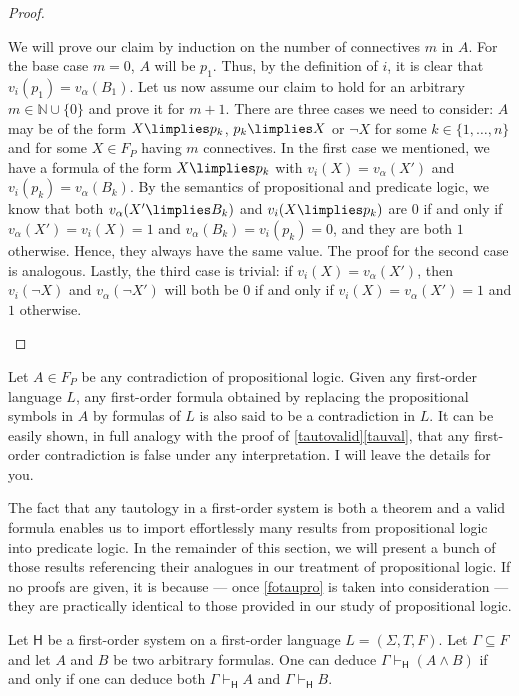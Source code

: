 \begin{proof}
\begin{parlist}
We will prove our claim by induction on the number of connectives $m$ in ${A}$. For the base case $m=0$, $A$ will be $p_1$. Thus, by the definition of $i$, it is clear that $v_i(p_1) = v_\alpha(B_1)$. 
Let us now assume our claim to hold for an arbitrary $m\in\mathbb{N} \cup \{0\}$ and prove it for $m+1$.
There are three cases we need to consider: $A$ may be of the form $X\limplies p_k$,  $p_k \limplies X$ or $\lnot X$ for some $k \in \{1,\ldots,n\}$ and for some $X\in F_P$ having $m$ connectives.
In the first case we mentioned, we have a formula of the form $X\limplies p_k$ with $v_i(X) = v_\alpha(X')$ and $v_i(p_k) = v_\alpha(B_k)$.
By the semantics of propositional and predicate logic, we know that both $v_\alpha(X' \limplies B_k)$ and $v_i(X\limplies p_k)$ are $0$ if and only if $v_\alpha(X') = v_i(X) = 1$ and $v_\alpha(B_k) = v_i(p_k) = 0$, and they are both $1$ otherwise.
Hence, they always have the same value. The proof for the second case is analogous. Lastly, the third case is trivial: if $v_i(X) = v_\alpha(X')$, then $v_i(\lnot X)$ and $v_\alpha(\lnot X')$ will both be $0$ if and only if $v_i(X) = v_\alpha(X') = 1$ and $1$ otherwise.
\end{parlist}

\end{proof}


\begin{para}
Let $A\in F_P$ be any contradiction of propositional logic. Given any first-order language $L$, any first-order formula obtained by replacing the propositional symbols in $A$ by formulas of $L$ is also said to be a contradiction in $L$.
It can be easily shown, in full analogy with the proof of \ref{tautovalid}\ref{tauval}, that any first-order contradiction is false under any interpretation. I will leave the details for you.
\end{para}


\begin{para}
The fact that any tautology in a first-order system is both a theorem and a valid formula enables us to import effortlessly many results from propositional logic into predicate logic.
In the remainder of this section, we will present a bunch of those results referencing their analogues in our treatment of propositional logic.
If no proofs are given, it is because --- once \ref{fotaupro} is taken into consideration --- they are practically identical to those provided in our study of propositional logic.
\end{para}

\begin{lemma}
Let $\mathsf{H}$ be a first-order system on a first-order language $L = (\Sigma, T, F)$. Let $\Gamma \subseteq F$ and let $A$ and $B$ be two arbitrary formulas. One can deduce $\Gamma\vdash_{\mathsf{H}} (A\land B)$ if and only if one can deduce both $\Gamma \vdash_{\mathsf{H}} A$ and $\Gamma \vdash_\mathsf{H} B$.
\label{}
\end{lemma}


